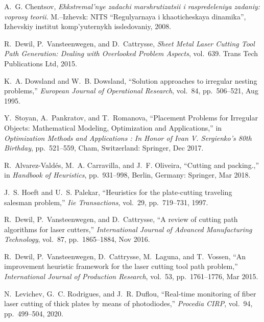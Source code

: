   \item
  A.~G. Chentsov, {\em Ehkstremal'nye zadachi marshrutizatsii i raspredeleniya
    zadaniy: voprosy teorii}.
  \newblock M.--Izhevsk: NITS ``Regulyarnaya i khaoticheskaya dinamika'',
    Izhevskiy institut komp'yuternykh issledovaniy, 2008.

  \item
  R.~Dewil, P.~Vansteenwegen, and D.~Cattrysse, {\em {Sheet Metal Laser Cutting
    Tool Path Generation: Dealing with Overlooked Problem Aspects}}, vol.~639.
  \newblock Trans Tech Publications Ltd, 2015.

  \item
  K.~A. Dowsland and W.~B. Dowsland, ``{Solution approaches to irregular nesting
    problems},'' {\em European Journal of Operational Research}, vol.~84,
    pp.~506--521, Aug 1995.

  \item
  Y.~Stoyan, A.~Pankratov, and T.~Romanova, ``{Placement Problems for Irregular
    Objects: Mathematical Modeling, Optimization and Applications},'' in {\em
    {Optimization Methods and Applications : In Honor of Ivan V. Sergienko's 80th
    Birthday}}, pp.~521--559, Cham, Switzerland: Springer, Dec 2017.

  \item
  R.~Alvarez-Vald{\'e}s, M.~A. Carravilla, and J.~F. Oliveira, ``Cutting and
    packing.,'' in {\em {Handbook of Heuristics}}, pp.~931--998, Berlin, Germany:
    Springer, Mar 2018.

  \item
  J.~S. Hoeft and U.~S. Palekar, ``Heuristics for the plate-cutting traveling
    salesman problem,'' {\em Iie Transactions}, vol.~29, pp.~719--731, 1997.

  \item
  R.~Dewil, P.~Vansteenwegen, and D.~Cattrysse, ``{A review of cutting path
    algorithms for laser cutters},'' {\em International Journal of Advanced
    Manufacturing Technology}, vol.~87, pp.~1865--1884, Nov 2016.

  \item
  R.~Dewil, P.~Vansteenwegen, D.~Cattrysse, M.~Laguna, and T.~Vossen, ``{An
    improvement heuristic framework for the laser cutting tool path problem},''
    {\em International Journal of Production Research}, vol.~53, pp.~1761--1776,
    Mar 2015.

  \item
  N.~Levichev, G.~C. Rodrigues, and J.~R. Duflou, ``Real-time monitoring of fiber
    laser cutting of thick plates by means of photodiodes,'' {\em Procedia CIRP},
    vol.~94, pp.~499--504, 2020.

